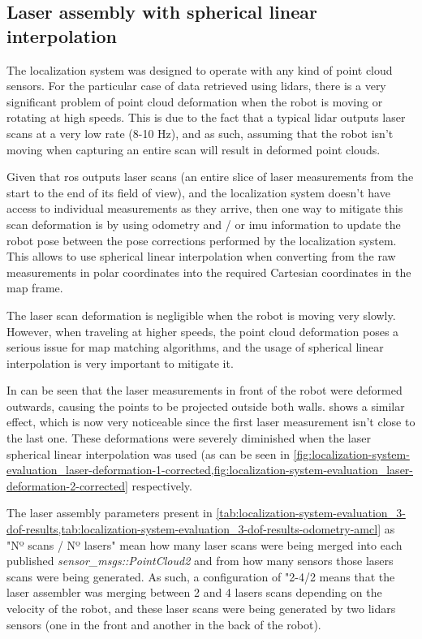 \subsection{Laser assembly with spherical linear interpolation}

The localization system was designed to operate with any kind of point cloud sensors. For the particular case of data retrieved using \glspl{lidar}, there is a very significant problem of point cloud deformation when the robot is moving or rotating at high speeds. This is due to the fact that a typical \gls{lidar} outputs laser scans at a very low rate (8-10 Hz), and as such, assuming that the robot isn't moving when capturing an entire scan will result in deformed point clouds.

Given that \gls{ros} outputs laser scans (an entire slice of laser measurements from the start to the end of its field of view), and the localization system doesn't have access to individual measurements as they arrive, then one way to mitigate this scan deformation is by using odometry and / or \gls{imu} information to update the robot pose between the pose corrections performed by the localization system. This allows to use spherical linear interpolation when converting from the raw measurements in polar coordinates into the required Cartesian coordinates in the map frame.

The laser scan deformation is negligible when the robot is moving very slowly. However, when traveling at higher speeds, the point cloud deformation poses a serious issue for map matching algorithms, and the usage of spherical linear interpolation is very important to mitigate it.

In  can be seen that the laser measurements in front of the robot were deformed outwards, causing the points to be projected outside both walls.  shows a similar effect, which is now very noticeable since the first laser measurement isn't close to the last one. These deformations were severely diminished when the laser spherical linear interpolation was used (as can be seen in \cref{fig:localization-system-evaluation_laser-deformation-1-corrected,fig:localization-system-evaluation_laser-deformation-2-corrected} respectively.

The laser assembly parameters present in \cref{tab:localization-system-evaluation_3-dof-results,tab:localization-system-evaluation_3-dof-results-odometry-amcl} as "Nº scans / Nº lasers" mean how many laser scans were being merged into each published \emph{sensor\_msgs::PointCloud2} and from how many sensors those lasers scans were being generated. As such, a configuration of "2-4/2 means that the laser assembler was merging between 2 and 4 lasers scans depending on the velocity of the robot, and these laser scans were being generated by two \glspl{lidar} sensors (one in the front and another in the back of the robot).


